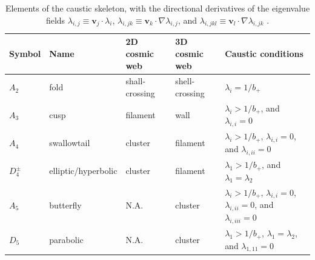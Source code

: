 \documentclass[a4paper, 11pt]{article}
\begin{document}
\begin{table}
\centering
{\scriptsize
\begin{tabular}{ |l | l | l | l | l|}
\hline
Symbol & Name & 2D cosmic web & 3D cosmic web & Caustic conditions\\
\hline
$A_2$ & fold & shall-crossing & shell-crossing & $\lambda_i = 1/ b_+$ \\
\hline
$A_3$ & cusp & filament & wall & $\lambda_i > 1/ b_+$, and $\lambda_{i,i} = 0$\\
\hline
$A_4$ & swallowtail & cluster & filament & $\lambda_i > 1/ b_+$, $\lambda_{i,i} = 0$, and $\lambda_{i,ii} = 0$\\
\hline
$D_4^{\pm}$ & elliptic/hyperbolic & cluster & filament & $\lambda_1 > 1/ b_+$, and $\lambda_1 = \lambda_2$\\
\hline
$A_5$ & butterfly & N.A. & cluster & $\lambda_i > 1/ b_+$, $\lambda_{i,i} = 0$, $\lambda_{i,ii} = 0$, and $\lambda_{i,iii} = 0$\\
\hline
$D_5$ & parabolic & N.A. & cluster & $\lambda_1 > 1/ b_+$, $\lambda_1 = \lambda_2$, and $\lambda_{1,11}=0$\\
\hline
\end{tabular}
}
\caption{Elements of the caustic skeleton, with the directional derivatives of the eigenvalue fields $\lambda_{i,j} \equiv \bm{v}_j \cdot \lambda_i$, $\lambda_{i,jk} \equiv \bm{v}_k \cdot \nabla \lambda_{i,j}$, and $\lambda_{i,jkl} \equiv \bm{v}_l \cdot \nabla \lambda_{i,jk}$ .}
\label{table:caustics}
\end{table}

\end{document}
